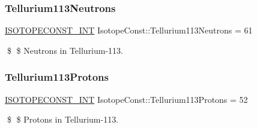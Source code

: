 \subsubsection{\texorpdfstring{Tellurium113\+Neutrons}{Tellurium113Neutrons}}
{\footnotesize\ttfamily \mbox{\hyperlink{group___isotope_const-_macros_ga5f18360b3e99483a35c32d789e62621c}{I\+S\+O\+T\+O\+P\+E\+C\+O\+N\+S\+T\+\_\+\+I\+NT}} Isotope\+Const\+::\+Tellurium113\+Neutrons = 61}

\$ \$ Neutrons in Tellurium-\/113. \mbox{\label{group___isotope_const-_tellurium-_te113_ga756459b61ea68abd67e74f16148d2950}} 
\subsubsection{\texorpdfstring{Tellurium113\+Protons}{Tellurium113Protons}}
{\footnotesize\ttfamily \mbox{\hyperlink{group___isotope_const-_macros_ga5f18360b3e99483a35c32d789e62621c}{I\+S\+O\+T\+O\+P\+E\+C\+O\+N\+S\+T\+\_\+\+I\+NT}} Isotope\+Const\+::\+Tellurium113\+Protons = 52}

\$ \$ Protons in Tellurium-\/113. 